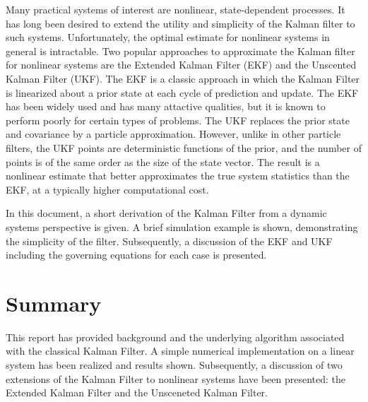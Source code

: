 \documentclass[12pt,draftcls,onecolumn]{IEEEtran}
\begin{document}
Many practical systems of interest are nonlinear, state-dependent processes.
It has long been desired to extend the utility and simplicity of the Kalman filter to such systems.
Unfortunately, the optimal estimate for nonlinear systems in general is intractable.
Two popular approaches to approximate the Kalman filter for nonlinear systems are the Extended Kalman Filter (EKF) and the Unscented Kalman Filter (UKF).
The EKF is a classic approach in which the Kalman Filter is linearized about a prior state at each cycle of prediction and update.
The EKF has been widely used and has many attactive qualities, but it is known to perform poorly for certain types of problems.
The UKF replaces the prior state and covariance by a particle approximation.
However, unlike in other particle filters, the UKF points are deterministic functions of the prior, and the number of points is of the same order as the size of the state vector.
The result is a nonlinear estimate that better approximates the true system statistics than the EKF, at a typically higher computational cost.

In this document, a short derivation of the Kalman Filter from a dynamic systems perspective is given.
A brief simulation example is shown, demonstrating the simplicity of the filter.
Subsequently, a discussion of the EKF and UKF including the governing equations for each case is presented.







\section{Summary}

This report has provided background and the underlying algorithm associated with the classical Kalman Filter.
A simple numerical implementation on a linear system has been realized and results shown.
Subsequently, a discussion of two extensions of the Kalman Filter to nonlinear systems have been presented: the Extended Kalman Filter and the Unsceneted Kalman Filter.

\nocite{kay1993,wan2000,julier1997,woodbury2015,kalman1960,crassidis2011}



\appendix

\end{document}
